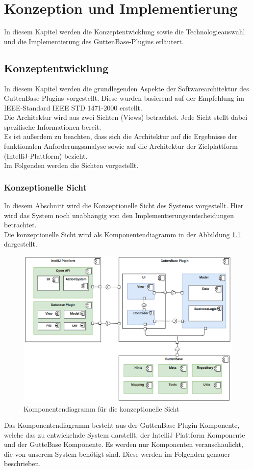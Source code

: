 \chapter{Konzeption und Implementierung}
\label{sec:kzimp}
In diesem Kapitel werden die Konzeptentwicklung sowie die Technologieauswahl und die Implementierung des GuttenBase-Plugins erläutert.
\section{Konzeptentwicklung}
	
	In diesem Kapitel werden die grundlegenden Aspekte der Softwarearchitektur des GuttenBase-Plugins vorgestellt. Diese wurden basierend auf der Empfehlung im IEEE-Standard IEEE STD 1471-2000 erstellt.\\
	Die Architektur wird aus zwei Sichten (Views) betrachtet. Jede Sicht stellt dabei spezifische Informationen bereit.\\
	Es ist außerdem zu beachten, dass sich die Architektur auf die Ergebnisse der funktionalen Anforderungsanalyse sowie auf die Architektur der Zielplattform (IntelliJ-Plattform) bezieht.\\
	Im Folgenden werden die Sichten vorgestellt.




	\subsection{Konzeptionelle Sicht}
	In diesem Abschnitt wird die Konzeptionelle Sicht des Systems vorgestellt. Hier wird das System noch unabhängig von den Implementierungsentscheidungen betrachtet. \\
	Die konzeptionelle Sicht wird als Komponentendiagramm in der Abbildung \ref{img:component-diagram} dargestellt. 
	\begin{figure}[H]
		\centering
		\includegraphics[width=\textwidth]{images/sichten/component-diagram}
		\caption{Komponentendiagramm für die konzeptionelle Sicht}
		\label{img:component-diagram}
	\end{figure}
	Das Komponentendiagramm besteht aus der GuttenBase Plugin Komponente, welche das zu entwickelnde System darstellt, der IntelliJ Plattform Komponente und der GutteBase Komponente. Es werden nur Komponenten veranschaulicht, die von unserem System benötigt sind. Diese werden im Folgenden genauer beschrieben.
	
